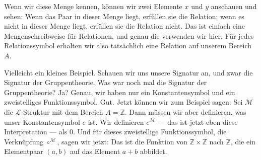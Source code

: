 \begin{spoken-clean}[00:48:03 - 00:50:03]
Wenn wir diese Menge kennen, können wir zwei Elemente $x$ und $y$ anschauen und sehen: Wenn das Paar in dieser Menge liegt, erfüllen sie die Relation; wenn es nicht in dieser Menge liegt, erfüllen sie die Relation nicht. Das ist einfach eine Mengenschreibweise für Relationen, und genau die verwenden wir hier. Für jedes Relationssymbol erhalten wir also tatsächlich eine Relation auf unserem Bereich $A$.

Vielleicht ein kleines Beispiel. Schauen wir uns unsere Signatur an, und zwar die Signatur der Gruppentheorie. Was war noch mal die Signatur der Gruppentheorie? Ja? Genau, wir haben nur ein Konstantensymbol und ein zweistelliges Funktionssymbol. Gut. Jetzt können wir zum Beispiel sagen: Sei $\mathcal{M}$ die $\mathcal{L}$-Struktur mit dem Bereich $A = \mathbb{Z}$. Dann müssen wir aber definieren, was unser Konstantensymbol $e$ ist. Wir definieren $e^{\mathcal{M}}$ --- das ist jetzt eben diese Interpretation --- als $0$. Und für dieses zweistellige Funktionssymbol, die Verknüpfung $\circ^{\mathcal{M}}$, sagen wir jetzt: Das ist die Funktion von $\mathbb{Z} \times \mathbb{Z}$ nach $\mathbb{Z}$, die ein Elementpaar $(a, b)$ auf das Element $a + b$ abbildet.
\end{spoken-clean}

\begin{math-stroke}
\end{math-stroke}

